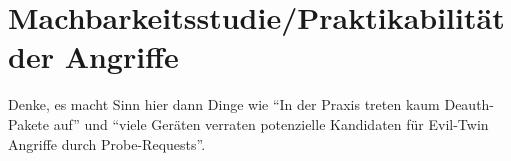 \section{Machbarkeitsstudie/Praktikabilität der Angriffe}
Denke, es macht Sinn hier dann Dinge wie \enquote{In der Praxis treten kaum Deauth-Pakete auf} und \enquote{viele Geräten verraten potenzielle Kandidaten für Evil-Twin Angriffe durch Probe-Requests}.